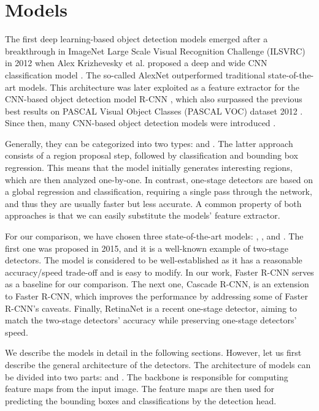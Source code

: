 \chapter{Models}
The first deep learning-based object detection models emerged after a breakthrough in ImageNet Large Scale Visual Recognition Challenge (ILSVRC) \cite{ILSVRC15} in 2012 when Alex Krizhevesky et al. proposed a deep and wide CNN classification model \cite{alexnet}. The so-called AlexNet outperformed traditional state-of-the-art models.  This architecture was later exploited as a feature extractor for the CNN-based object detection model R-CNN \cite{rcnn}, which also surpassed the previous best results on PASCAL Visual Object Classes (PASCAL VOC) dataset 2012 \cite{voc}. Since then, many CNN-based object detection models were introduced \cite{odreview}.

Generally, they can be categorized into two types:  and . The latter approach consists of a region proposal step, followed by classification and bounding box regression. This means that the model initially generates interesting regions, which are then analyzed one-by-one. In contrast, one-stage detectors are based on a global regression and classification, requiring a single pass through the network, and thus they are usually faster but less accurate. A common property of both approaches is that we can easily substitute the models' feature extractor. 

For our comparison, we have chosen three state-of-the-art models:  \cite{fasterrcnn},  \cite{cascadercnn}, and  \cite{retinanet}. The first one was proposed in 2015, and it is a well-known example of two-stage detectors. The model is considered to be well-established as it has a reasonable accuracy/speed trade-off and is easy to modify. In our work, Faster R-CNN serves as a baseline for our comparison. The next one, Cascade R-CNN, is an extension to Faster R-CNN, which improves the performance by addressing some of Faster R-CNN's caveats. Finally, RetinaNet is a recent one-stage detector, aiming to match the two-stage detectors' accuracy while preserving one-stage detectors' speed. 

We describe the models in detail in the following sections. However, let us first describe the general architecture of the detectors. The architecture of models can be divided into two parts:  and . The backbone is responsible for computing feature maps from the input image. The feature maps are then used for predicting the bounding boxes and classifications by the detection head. 

